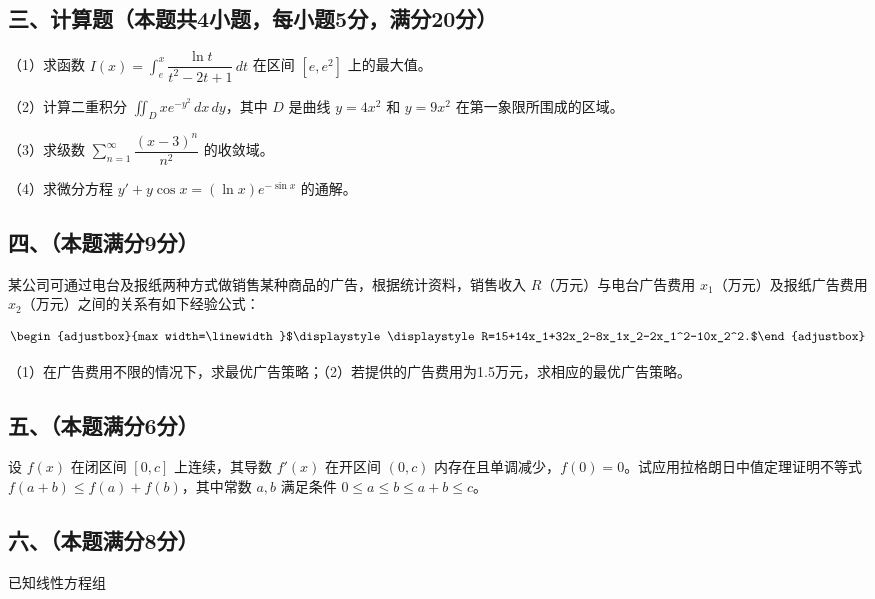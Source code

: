 \documentclass[UTF8,12pt]{ctexart}
\newcommand{\fitmath}[1]{\begin{adjustbox}{max width=\linewidth}$\displaystyle #1$\end{adjustbox}}
\begin{document}
\subsection*{三、计算题（本题共4小题，每小题5分，满分20分）}

（1）求函数 \(\displaystyle I(x)=\displaystyle \int_e^x\dfrac{\displaystyle \ln t}{\displaystyle t^2-2t+1}\,dt\) 在区间 \(\displaystyle [e,\allowbreak e^2]\) 上的最大值。


（2）计算二重积分 \(\displaystyle \iint_D xe^{-y^2}\,dx\,dy\)，其中 \(\displaystyle D\) 是曲线 \(\displaystyle y=4x^2\) 和 \(\displaystyle y=9x^2\) 在第一象限所围成的区域。


（3）求级数 \(\displaystyle \sum_{n=1}^{\infty}\dfrac{\displaystyle (x-3)^n}{\displaystyle n^2}\) 的收敛域。


（4）求微分方程 \(\displaystyle y\prime+y\cos x=(\ln x)e^{-\sin x}\) 的通解。


\subsection*{四、（本题满分9分）}

某公司可通过电台及报纸两种方式做销售某种商品的广告，根据统计资料，销售收入 \(\displaystyle R\)（万元）与电台广告费用 \(\displaystyle x_1\)（万元）及报纸广告费用 \(\displaystyle x_2\)（万元）之间的关系有如下经验公式：


\[\fitmath{\displaystyle R=15+14x_1+32x_2-8x_1x_2-2x_1^2-10x_2^2.}\]


（1）在广告费用不限的情况下，求最优广告策略；（2）若提供的广告费用为1.5万元，求相应的最优广告策略。


\subsection*{五、（本题满分6分）}

设 \(\displaystyle f(x)\) 在闭区间 \(\displaystyle [0,\allowbreak c]\) 上连续，其导数 \(\displaystyle f\prime(x)\) 在开区间 \(\displaystyle (0,\allowbreak c)\) 内存在且单调减少，\(\displaystyle f(0)=0\)。试应用拉格朗日中值定理证明不等式 \(\displaystyle f(a+b)\le f(a)+f(b)\)，其中常数 \(\displaystyle a,\allowbreak b\) 满足条件 \(\displaystyle 0\le a\le b\le a+b\le c\)。


\subsection*{六、（本题满分8分）}

已知线性方程组
\end{document}
